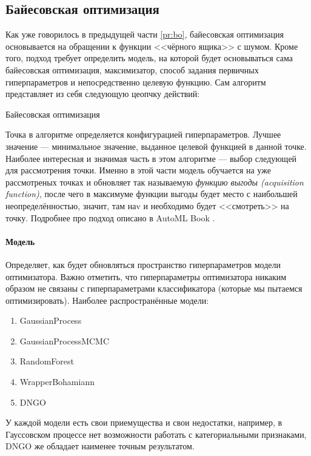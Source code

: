\documentclass[times,specification,annotation]{itmo-student-thesis}
\begin{document}
	\subsection{Байесовская оптимизация} \label{ss:bo}
	Как уже говорилось в предыдущей части \ref{pr:bo}, байесовская оптимизация основывается на обращении к функции <<чёрного ящика>> с шумом. Кроме того, подход требует определить модель, на которой будет основываться сама байесовская оптимизация, максимизатор, способ задания первичных гиперпараметров и непосредственно целевую функцию. Сам алгоритм представляет из себя следующую цеопчку действий:
	
	\begin{algorithm}[!ht]
		\caption{Байесовская оптимизация}\label{alg:bo}
		\begin{algorithmic}
			\EndFor
		\end{algorithmic}
	\end{algorithm}

	Точка в алгоритме определяется конфигурацией гиперпараметров. Лучшее значение --- минимальное значение, выданное целевой функцией в данной точке. Наиболее интересная и значимая часть в этом алгоритме --- выбор следующей для рассмотрения точки. Именно в этой части модель обучается на уже рассмотреных точках и обновляет так называемую \textit{функцию выгоды (acquisition function)}, после чего в максимуме функции выгоды будет место с наибольшей неопределённостью, значит, там наv и необходимо будет <<смотреть>> на точку. Подробнее про подход описано в AutoML Book \cite{feurer-automlbook19a}.

	\paragraph{Модель} Определяет, как будет обновляться пространство гиперпараметров модели оптимизатора. Важно отметить, что гиперпараметры оптимизатора никаким образом не связаны с гиперпараметрами классификатора (которые мы пытаемся оптимизировать). Наиболее распространённые модели:
	\begin{enumerate}
		\item GaussianProcess \label{nm:gp}
		\item GaussianProcessMCMC
		\item RandomForest \label{nm:rf}
		\item WrapperBohamiann
		\item DNGO
	\end{enumerate}
	У каждой модели есть свои приемущества и свои недостатки, например, в Гауссовском процессе нет возможности работать с категориальными признаками, DNGO же обладает наименее точным результатом.
\end{document}
